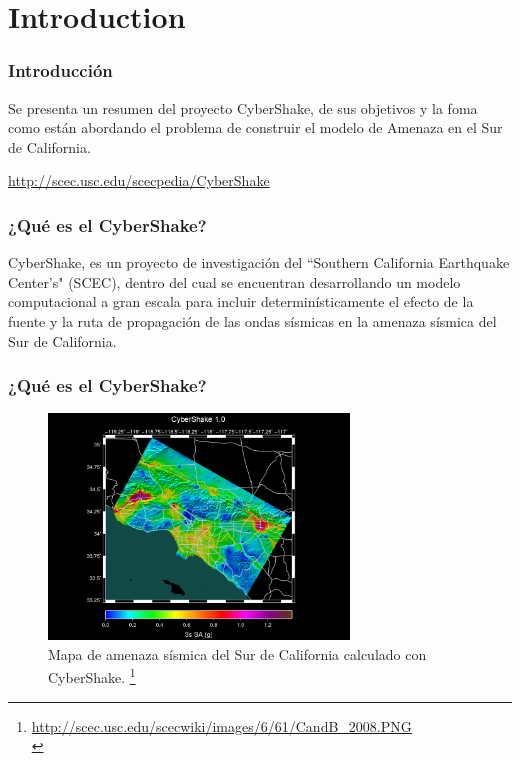 \documentclass{beamer}
\begin{document}
\section{Introduction}
\begin{frame}
\frametitle{Introducción}
%
\justifying
Se presenta un resumen del proyecto {C}yber{S}hake, de sus objetivos y la foma como están abordando el problema de construir el modelo de Amenaza en el Sur de California.

\url{http://scec.usc.edu/scecpedia/CyberShake}
%
\end{frame}
%
%
\begin{frame}[allowframebreaks]
\frametitle{¿Qué es el CyberShake?}
%
\justifying
{C}yber{S}hake, es un proyecto de investigación del ``Southern California Earthquake Center's" (SCEC), dentro del cual se encuentran desarrollando un modelo computacional a gran escala para incluir determinísticamente el efecto de la fuente y la ruta de propagación de las ondas sísmicas en la amenaza sísmica del Sur de California.
%
\end{frame}
%
\begin{frame}
\frametitle{¿Qué es el CyberShake?}
\begin{figure}[h]
	\centering
	\includegraphics[height=6cm]{img/CyberShake_2009.PNG}
	\caption{Mapa de amenaza sísmica del Sur de California calculado con CyberShake. \footnote{\url{http://scec.usc.edu/scecwiki/images/6/61/CandB_2008.PNG}\\}}
\end{figure} 
%
\end{frame}
%
%
\end{document}

